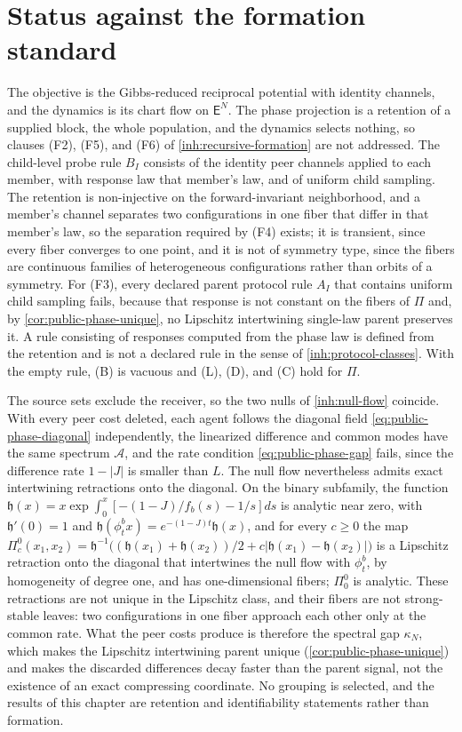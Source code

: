 \section{Status against the formation standard}
\label{sec:public-status}

The objective is the Gibbs-reduced reciprocal potential with identity channels, and the dynamics is its chart flow on $\mathsf E^N$. The phase projection is a retention of a supplied block, the whole population, and the dynamics selects nothing, so clauses (F2), (F5), and (F6) of \cref{inh:recursive-formation} are not addressed. The child-level probe rule $B_I$ consists of the identity peer channels applied to each member, with response law that member's law, and of uniform child sampling. The retention is non-injective on the forward-invariant neighborhood, and a member's channel separates two configurations in one fiber that differ in that member's law, so the separation required by (F4) exists; it is transient, since every fiber converges to one point, and it is not of symmetry type, since the fibers are continuous families of heterogeneous configurations rather than orbits of a symmetry. For (F3), every declared parent protocol rule $A_I$ that contains uniform child sampling fails, because that response is not constant on the fibers of $\Pi$ and, by \cref{cor:public-phase-unique}, no Lipschitz intertwining single-law parent preserves it. A rule consisting of responses computed from the phase law is defined from the retention and is not a declared rule in the sense of \cref{inh:protocol-classes}. With the empty rule, (B) is vacuous and (L), (D), and (C) hold for $\Pi$.

The source sets exclude the receiver, so the two nulls of \cref{inh:null-flow} coincide. With every peer cost deleted, each agent follows the diagonal field \cref{eq:public-phase-diagonal} independently, the linearized difference and common modes have the same spectrum $\mathcal A$, and the rate condition \cref{eq:public-phase-gap} fails, since the difference rate $1-|J|$ is smaller than $L$. The null flow nevertheless admits exact intertwining retractions onto the diagonal. On the binary subfamily, the function $\mathfrak h(x)=x\exp\int_0^x[-(1-J)/f_b(s)-1/s]ds$ is analytic near zero, with $\mathfrak h'(0)=1$ and $\mathfrak h(\phi^b_tx)=e^{-(1-J)t}\mathfrak h(x)$, and for every $c\geq0$ the map $\Pi^0_c(x_1,x_2)=\mathfrak h^{-1}\bigl((\mathfrak h(x_1)+\mathfrak h(x_2))/2+c|\mathfrak h(x_1)-\mathfrak h(x_2)|\bigr)$ is a Lipschitz retraction onto the diagonal that intertwines the null flow with $\phi^b_t$, by homogeneity of degree one, and has one-dimensional fibers; $\Pi^0_0$ is analytic. These retractions are not unique in the Lipschitz class, and their fibers are not strong-stable leaves: two configurations in one fiber approach each other only at the common rate. What the peer costs produce is therefore the spectral gap $\kappa_N$, which makes the Lipschitz intertwining parent unique (\cref{cor:public-phase-unique}) and makes the discarded differences decay faster than the parent signal, not the existence of an exact compressing coordinate. No grouping is selected, and the results of this chapter are retention and identifiability statements rather than formation.
